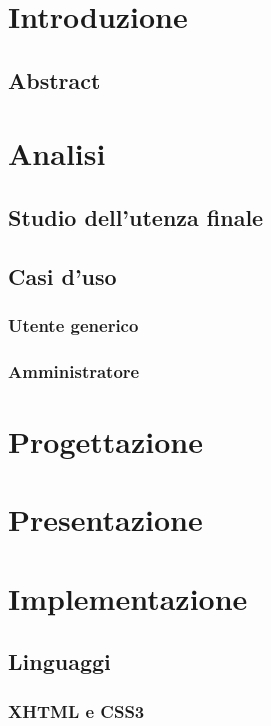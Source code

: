\documentclass[a4paper, oneside, openany, dvipsnames, table]{article}
\begin{document}
\copertina
\tableofcontents
\newpage
\section{Introduzione}
	
	\subsection{Abstract}
		
\newpage
\section{Analisi}
	
	\subsection{Studio dell'utenza finale}
		
	\subsection{Casi d'uso}
		
		\subsubsection{Utente generico}
			
		\subsubsection{Amministratore}
			
\newpage
\section{Progettazione}
\newpage
\section{Presentazione}
\newpage
\section{Implementazione}
	
	\subsection{Linguaggi}
		
		\subsubsection{XHTML e CSS3}
\end{document}
